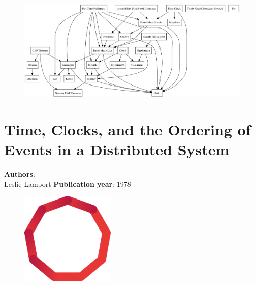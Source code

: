 \documentclass[11pt,fleqn]{book} %
\begin{document}
\vspace*{5mm}

\begin{figure}[h]
\centering
\includegraphics[width=1\textwidth]{dependency}
\end{figure}

\chapter{Time, Clocks, and the Ordering of Events in a Distributed System}
\vspace*{-7mm}
\Large \textbf{Authors}: \\
Leslie Lamport
\newline\newline
\textbf{Publication year}: 1978
\begin{figure}[b]
    \centering
    \includegraphics[width=0.4\textwidth]{distributed-systems-red.pdf}
\end{figure}

\end{document}
